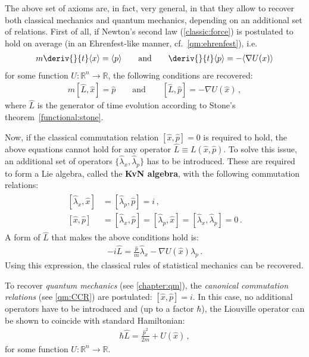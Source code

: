     \begin{property}[Generality]
        The above set of axioms are, in fact, very general, in that they allow to recover both classical mechanics and quantum mechanics, depending on an additional set of relations. First of all, if Newton's second law (\cref{classic:force}) is postulated to hold on average (in an Ehrenfest-like manner, cf.~\cref{qm:ehrenfest}), i.e.
        \begin{gather}
            m\deriv{}{t}\langle x\rangle=\langle p\rangle \qquad\text{and}\qquad \deriv{}{t}\langle p\rangle=-\langle\nabla U(x)\rangle
        \end{gather}
        for some function $U:\mathbb{R}^n\rightarrow\mathbb{R}$, the following conditions are recovered:
        \begin{gather}
            m[\widehat{L},\widehat{x}]=\widehat{p} \qquad\text{and}\qquad [\widehat{L},\widehat{p}]=-\nabla U(\widehat{x})\,,
        \end{gather}
        where $\widehat{L}$ is the generator of time evolution according to Stone's theorem~\ref{functional:stone}.

        Now, if the classical commutation relation $[\widehat{x},\widehat{p}]=0$ is required to hold, the above equations cannot hold for any operator $\widehat{L}\equiv L(\widehat{x},\widehat{p})$. To solve this issue, an additional set of operators $\{\widehat{\lambda}_x,\widehat{\lambda}_p\}$ has to be introduced. These are required to form a Lie algebra, called the \textbf{KvN algebra}, with the following commutation relations:
        \begin{gather}
            \begin{aligned}
                [\widehat{\lambda}_x,\widehat{x}] &= [\widehat{\lambda}_p,\widehat{p}] = i\,,\\
                [\widehat{x},\widehat{p}] &= [\widehat{\lambda}_x,\widehat{p}] = [\widehat{\lambda}_p,\widehat{x}] = [\widehat{\lambda}_x,\widehat{\lambda}_p] = 0\,.
            \end{aligned}
        \end{gather}
        A form of $\widehat{L}$ that makes the above conditions hold is:
        \begin{gather}
            -i\widehat{L} = \frac{\widehat{p}}{m}\widehat{\lambda}_x - \nabla U(\widehat{x})\widehat{\lambda}_p\,.
        \end{gather}
        Using this expression, the classical rules of statistical mechanics can be recovered.

        To recover \textit{quantum mechanics} (see \cref{chapter:qm}), the \textit{canonical commutation relations} (see \cref{qm:CCR}) are postulated: $[\widehat{x},\widehat{p}]=i$. In this case, no additional operators have to be introduced and (up to a factor $\hbar$), the Liouville operator can be shown to coincide with standard Hamiltonian:
        \begin{gather}
            \hbar\widehat{L} = \frac{\widehat{p}^2}{2m}+U(\widehat{x})\,,
        \end{gather}
        for some function $U:\mathbb{R}^n\rightarrow\mathbb{R}$.
    \end{property}

